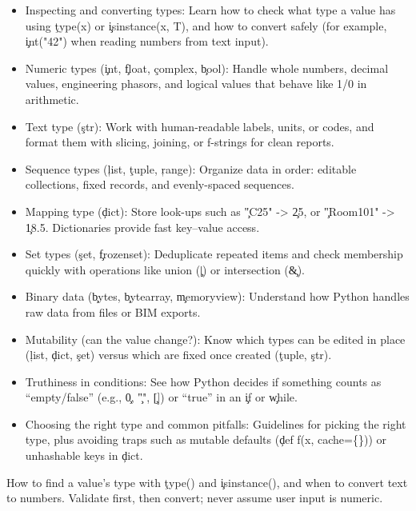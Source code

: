 \begin{tcolorbox}[%
    title=Focus of this chapter:,
    colframe=orange,
    colback = white,
    arc=2mm %
 ]
\begin{itemize}
    \item Inspecting and converting types: Learn how to check what type a value has using \c{type(x)} or \c{isinstance(x, T)}, and how to convert safely (for example, \c{int("42")} when reading numbers from text input).
    \item Numeric types (\c{int}, \c{float}, \c{complex}, \c{bool}): Handle whole numbers, decimal values, engineering phasors, and logical values that behave like 1/0 in arithmetic.
    \item Text type (\c{str}): Work with human-readable labels, units, or codes, and format them with slicing, joining, or f-strings for clean reports.
    \item Sequence types (\c{list}, \c{tuple}, \c{range}): Organize data in order: editable collections, fixed records, and evenly-spaced sequences.
    \item Mapping type (\c{dict}): Store look-ups such as \c{"C25"} -> \c{25}, or \c{"Room101"} -> \c{18.5}. Dictionaries provide fast key--value access.
    \item Set types (\c{set}, \c{frozenset}): Deduplicate repeated items and check membership quickly with operations like union (\c{|}) or intersection (\c{\&}).
    \item Binary data (\c{bytes}, \c{bytearray}, \c{memoryview}): Understand how Python handles raw data from files or BIM exports.
    \item Mutability (can the value change?): Know which types can be edited in place (\c{list}, \c{dict}, \c{set}) versus which are fixed once created (\c{tuple}, \c{str}).
    \item Truthiness in conditions: See how Python decides if something counts as “empty/false” (e.g., \c{0}, \c{""}, \c{[]}) or “true” in an \c{if} or \c{while}.
    \item Choosing the right type and common pitfalls: Guidelines for picking the right type, plus avoiding traps such as mutable defaults (\c{def f(x, cache=\{\})}) or unhashable keys in \c{dict}.
\end{itemize}
\end{tcolorbox}
How to find a value's type with \c{type()} and \c{isinstance()},
and when to convert text to numbers. Validate first, then convert; never assume user input is numeric.


